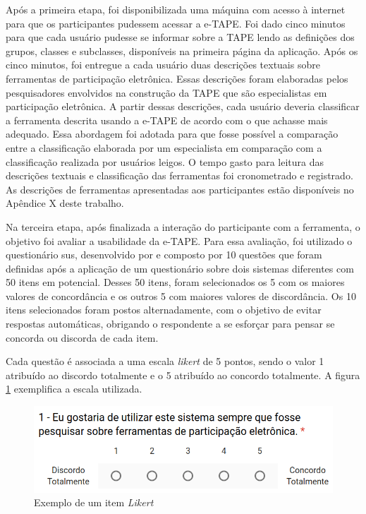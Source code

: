 \par
Após a primeira etapa, foi disponibilizada uma máquina com acesso à internet para que os participantes pudessem acessar a e-TAPE. Foi dado cinco minutos para que cada usuário pudesse se informar sobre a TAPE lendo as definições dos grupos, classes e subclasses,
disponíveis na primeira página da aplicação. 
Após os cinco minutos, foi entregue a cada usuário duas descrições textuais sobre ferramentas de participação eletrônica. Essas descrições foram elaboradas pelos pesquisadores envolvidos na construção da TAPE que são especialistas em participação eletrônica. 
A partir dessas descrições, cada usuário deveria classificar a ferramenta descrita usando a e-TAPE de acordo com o que achasse mais adequado.
Essa abordagem foi adotada para que fosse possível a comparação entre a classificação elaborada por um especialista em comparação com a classificação realizada por usuários leigos. O tempo gasto para leitura das descrições textuais e classificação das ferramentas foi cronometrado e registrado. As descrições de ferramentas apresentadas aos participantes estão disponíveis no Apêndice X deste trabalho.

\par
Na terceira etapa, após finalizada a interação do participante com a ferramenta, o objetivo foi avaliar a usabilidade da e-TAPE.
Para essa avaliação, foi utilizado o questionário \acrfull{sus}, desenvolvido por  e composto por 10 questões que foram definidas após a aplicação de um questionário sobre dois sistemas diferentes com 50 itens em potencial. Desses 50 itens, foram selecionados os 5 com os maiores valores de concordância e os outros 5 com maiores valores de discordância. Os 10 itens selecionados
foram postos alternadamente, com o objetivo de evitar respostas automáticas, obrigando o respondente a se esforçar para pensar se concorda ou discorda de cada item. 

\par

Cada questão é associada a uma escala \textit{likert} de 5 pontos, sendo o valor 1 atribuído ao discordo totalmente e o 5 atribuído ao concordo totalmente.
A figura \ref{fig:exemplo-pergunta} exemplifica a escala utilizada.

\begin{figure}[!ht]
    \centering
    \includegraphics[scale=0.5]{./figuras/exemplo_pergunta.png}
    \caption{Exemplo de um item \textit{Likert}}
    \label{fig:exemplo-pergunta}
\end{figure}

